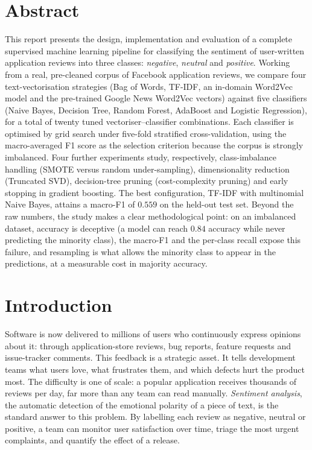 \documentclass[11pt,a4paper]{article}
\begin{document}
\section*{Abstract}
This report presents the design, implementation and evaluation of a complete
supervised machine learning pipeline for classifying the sentiment of user-written
application reviews into three classes: \emph{negative}, \emph{neutral} and
\emph{positive}. Working from a real, pre-cleaned corpus of Facebook application
reviews, we compare four text-vectorisation strategies (Bag of Words, TF-IDF, an
in-domain Word2Vec model and the pre-trained Google News Word2Vec vectors) against
five classifiers (Naive Bayes, Decision Tree, Random Forest, AdaBoost and Logistic
Regression), for a total of twenty tuned vectoriser--classifier combinations. Each
classifier is optimised by grid search under five-fold stratified cross-validation,
using the macro-averaged F1 score as the selection criterion because the corpus is
strongly imbalanced. Four further experiments study, respectively, class-imbalance
handling (SMOTE versus random under-sampling), dimensionality reduction (Truncated
SVD), decision-tree pruning (cost-complexity pruning) and early stopping in gradient
boosting. The best configuration, TF-IDF with multinomial Naive Bayes, attains a
macro-F1 of $0.559$ on the held-out test set. Beyond the raw numbers, the study makes
a clear methodological point: on an imbalanced dataset, accuracy is deceptive (a model
can reach $0.84$ accuracy while never predicting the minority class), the macro-F1 and
the per-class recall expose this failure, and resampling is what allows the minority
class to appear in the predictions, at a measurable cost in majority accuracy.

\section{Introduction}
Software is now delivered to millions of users who continuously express opinions about
it: through application-store reviews, bug reports, feature requests and issue-tracker
comments. This feedback is a strategic asset. It tells development teams what users
love, what frustrates them, and which defects hurt the product most. The difficulty is
one of scale: a popular application receives thousands of reviews per day, far more
than any team can read manually. \emph{Sentiment analysis}, the automatic detection of
the emotional polarity of a piece of text, is the standard answer to this problem. By
labelling each review as negative, neutral or positive, a team can monitor user
satisfaction over time, triage the most urgent complaints, and quantify the effect of a
release.
\end{document}
